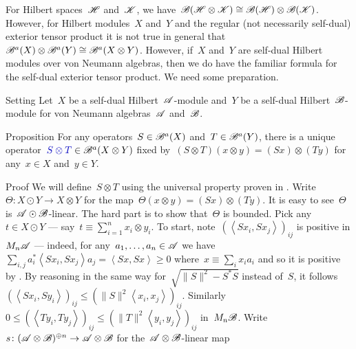 \documentclass[b]{subfiles}
\begin{document}
\begin{parsec}%
\begin{point}%
For Hilbert spaces~$\mathscr{H}$ and~$\mathscr{K}$,
    we have~$\mathscr{B}(\mathscr{H} \otimes \mathscr{K})
        \cong \mathscr{B}(\mathscr{H}) \otimes \mathscr{B}(\mathscr{K})$.
However, for Hilbert modules~$X$ and~$Y$
    and the regular (not necessarily self-dual)
        exterior tensor product
        it is not true in general
        that~$\mathscr{B}^a(X) \otimes \mathscr{B}^a(Y) \cong \mathscr{B}^a(X \otimes Y)$.
However, if~$X$ and~$Y$ are self-dual Hilbert modules over von Neumann
    algebras, then we do have the familiar formula
    for the self-dual exterior tensor product.
We need some preparation.
\end{point}
\begin{point}{Setting}%
Let~$X$ be a self-dual Hilbert~$\mathscr{A}$-module
    and~$Y$ be a self-dual Hilbert~$\mathscr{B}$-module
    for von Neumann algebras~$\mathscr{A}$ and~$\mathscr{B}$.
\end{point}
\begin{point}{Proposition}%
For any operators~$S \in \mathscr{B}^a(X)$ and~$T \in \mathscr{B}^a(Y)$,
there is a unique operator~$\Define{S \otimes T} \in \scrB^a(X\otimes Y)$%
    fixed by~$(S \otimes T) (x \otimes y) = (S x) \otimes (T y)$
    for any~$x\in X$ and~$y \in Y$.
\begin{point}{Proof}%
We will define~$S \otimes T$ using the universal
    property proven in .
Write~$\Theta \colon X \odot Y \to X \otimes Y$
    for the map~$\Theta(x \otimes y) = (Sx) \otimes (Ty)$.
It is easy to see~$\Theta$ is~$\mathscr{A} \odot \mathscr{B}$-linear.
The hard part is to show that~$\Theta$ is bounded.
Pick any~$t \in X \odot Y$ --- say~$t \equiv \sum^n_{i=1} x_i \otimes y_i$.
To start, note~$(\left<Sx_i, Sx_j\right>)_{ij}$ is positive in $M_n \mathscr{A}$ ---
    indeed, for any~$a_1, \ldots, a_n \in \mathscr{A}$
    we have~$\sum_{i,j} a_i^* \left<S x_i, S x_j\right> a_j
            = \left<Sx,Sx\right> \geq 0$
                where~$x \equiv \sum_i x_i a_i$
                and so it is positive
                by .
By reasoning in the same way for~$\sqrt{\|S\|^2 - S^*S}$
instead of~$S$,
it follows~$(\left<Sx_i, Sy_i \right>)_{ij} \leq (\|S\|^2 \left<x_i,x_j\right>)_{ij}$.
Similarly~$0 \leq (\left<Ty_i, Ty_j\right>)_{ij} \leq (\|T\|^2 \left<y_i, y_j\right>)_{ij}$ in~$M_n \mathscr{B}$.
Write~$s\colon (\mathscr{A} \otimes \mathscr{B})^{\oplus n} \to \mathscr{A} \otimes \mathscr{B}$
    for the~$\mathscr{A} \otimes \mathscr{B}$-linear map

\end{point}
\end{point}
\end{parsec}
\end{document}
